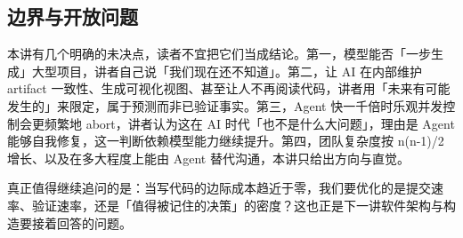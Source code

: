 \documentclass[a4paper]{article}
\begin{document}
\subsection{边界与开放问题}

本讲有几个明确的未决点，读者不宜把它们当成结论。第一，模型能否「一步生成」大型项目，讲者自己说「我们现在还不知道」。第二，让 AI 在内部维护 artifact 一致性、生成可视化视图、甚至让人不再阅读代码，讲者用「未来有可能发生的」来限定，属于预测而非已验证事实。第三，Agent 快一千倍时乐观并发控制会更频繁地 abort，讲者认为这在 AI 时代「也不是什么大问题」，理由是 Agent 能够自我修复，这一判断依赖模型能力继续提升。第四，团队复杂度按 n(n-1)/2 增长、以及在多大程度上能由 Agent 替代沟通，本讲只给出方向与直觉。

真正值得继续追问的是：当写代码的边际成本趋近于零，我们要优化的是提交速率、验证速率，还是「值得被记住的决策」的密度？这也正是下一讲软件架构与构造要接着回答的问题。
\end{document}
